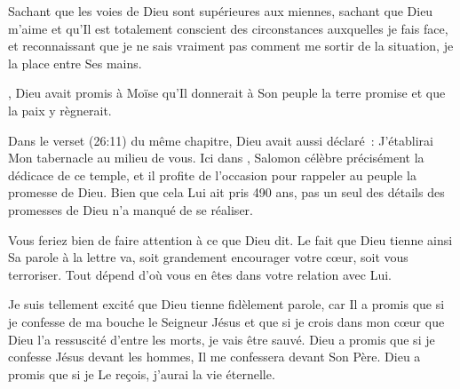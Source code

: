 Sachant que les voies de Dieu sont supérieures aux miennes,
 sachant que Dieu m'aime et qu'Il est totalement conscient des circonstances
 auxquelles je fais face, et reconnaissant que je ne sais vraiment pas comment
 me sortir de la situation, je la place entre Ses mains. 

\dvrule






,
 Dieu avait promis à Moïse qu'Il donnerait à Son peuple
 la terre promise et que la paix y règnerait.

Dans le verset (26:11) du même chapitre, Dieu avait aussi déclaré~:
 \og J'établirai Mon tabernacle au milieu de vous. \fg{}
 Ici dans , Salomon célèbre précisément
 la dédicace de ce temple, et il profite de l'occasion pour rappeler au peuple
 la promesse de Dieu.
 Bien que cela Lui ait pris 490 ans, pas un seul des détails des promesses
 de Dieu n'a manqué de se réaliser. 


Vous feriez bien de faire attention à ce que Dieu dit.
 Le fait que Dieu tienne ainsi Sa parole à la lettre va,
 soit grandement encourager votre c\oe{}ur, soit vous terroriser.
 Tout dépend d'où vous en êtes dans votre relation avec Lui. 

Je suis tellement excité que Dieu tienne fidèlement parole,
 car Il a promis que si je confesse de ma bouche le Seigneur Jésus
 et que si je crois dans mon c\oe{}ur que Dieu l'a ressuscité
 d'entre les morts, je vais être sauvé.
 Dieu a promis que si je confesse Jésus devant les hommes,
 Il me confessera devant Son Père.
 Dieu a promis que si je Le reçois, j'aurai la vie éternelle. 


\dvrule



